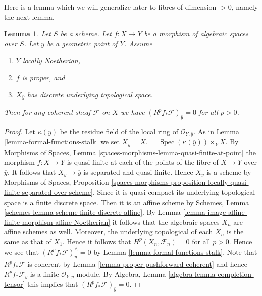 \documentclass{stacks-project}
\theoremstyle{plain}
\newtheorem{lemma}[subsection]{Lemma}
\theoremstyle{definition}
\theoremstyle{remark}
\numberwithin{equation}{subsection}
\def\Spec{\mathop{\mathrm{Spec}}}
\begin{document}
\noindent
Here is a lemma which we will generalize later to fibres of
dimension $ > 0$, namely the next lemma.

\begin{lemma}
\label{lemma-higher-direct-images-zero-finite-fibre}
Let $S$ be a scheme. Let $f : X \to Y$ be a morphism of algebraic spaces
over $S$. Let $\overline{y}$ be a geometric point of $Y$.
Assume
\begin{enumerate}
\item $Y$ locally Noetherian,
\item $f$ is proper, and
\item $X_{\overline{y}}$ has discrete underlying topological space.
\end{enumerate}
Then for any coherent sheaf $\mathcal{F}$ on $X$ we have
$(R^pf_*\mathcal{F})_{\overline{y}} = 0$ for all $p > 0$.
\end{lemma}

\begin{proof}
Let $\kappa(\overline{y})$ be the residue field of the local
ring of $\mathcal{O}_{Y, \overline{y}}$. As in
Lemma \ref{lemma-formal-functions-stalk}
we set $X_{\overline{y}} = X_1 = \Spec(\kappa(\overline{y})) \times_Y X$.
By Morphisms of Spaces, Lemma
\ref{spaces-morphisms-lemma-quasi-finite-at-point}
the morphism $f : X \to Y$ is quasi-finite at each of
the points of the fibre of $X \to Y$ over $\overline{y}$.
It follows that $X_{\overline{y}} \to \overline{y}$ is separated and
quasi-finite. Hence $X_{\overline{y}}$ is a scheme
by Morphisms of Spaces, Proposition
\ref{spaces-morphisms-proposition-locally-quasi-finite-separated-over-scheme}.
Since it is quasi-compact its underlying topological space is a finite
discrete space. Then it is an affine scheme by
Schemes, Lemma \ref{schemes-lemma-scheme-finite-discrete-affine}.
By Lemma \ref{lemma-image-affine-finite-morphism-affine-Noetherian}
it follows that the algebraic spaces $X_n$ are affine schemes as well.
Moreover, the underlying topological of each $X_n$ is the same
as that of $X_1$. Hence it follows that $H^p(X_n, \mathcal{F}_n) = 0$
for all $p > 0$. Hence we see that
$(R^pf_*\mathcal{F})_{\overline{y}}^\wedge = 0$
by Lemma \ref{lemma-formal-functions-stalk}.
Note that $R^pf_*\mathcal{F}$ is coherent by
Lemma \ref{lemma-proper-pushforward-coherent} and
hence $R^pf_*\mathcal{F}_{\overline{y}}$ is a finite
$\mathcal{O}_{Y, \overline{y}}$-module.
By Algebra, Lemma \ref{algebra-lemma-completion-tensor}
this implies that $(R^pf_*\mathcal{F})_{\overline{y}} = 0$.
\end{proof}
\end{document}

